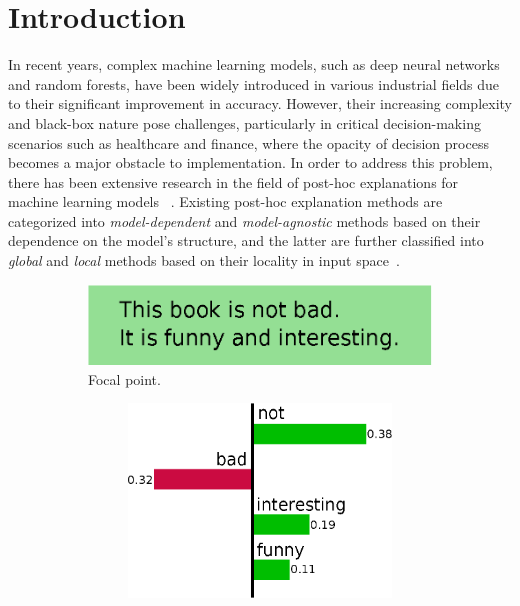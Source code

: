 \documentclass[runningheads]{llncs}
\begin{document}
{\section{Introduction}\label{sec:introduction}
In recent years,
complex machine learning models, such as deep neural networks and random forests,
have been widely introduced in various industrial fields
due to their significant improvement in accuracy.
However,
their increasing complexity and black-box nature pose challenges,
particularly in critical decision-making scenarios such as healthcare and finance,
where the opacity of decision process becomes a major obstacle to implementation.
In order to address this problem,
there has been extensive research in the field of post-hoc explanations
for machine learning models
~\cite{guidotti2018local,ribeiro2016why,ribeiro2018anchors}.
Existing post-hoc explanation methods are categorized
into \emph{model-dependent} and \emph{model-agnostic} methods
based on their dependence on the model's structure,
and the latter are further classified into \emph{global} and \emph{local} methods
based on their locality in input space~\cite{samek2021explaining}.
\begin{figure}[tbp]
  \def\scale{0.38}
  \centering
  \begin{subfigure}[t]{0.55\textwidth}
    \centering
    \includegraphics[scale=\scale]{example-instance}
    \caption{Focal point.}\label{fig:example-instance}
    \vspace{0.5cm}
  \end{subfigure}
  \begin{subfigure}[t]{0.45\textwidth}
    \begin{subfigure}[t]{\textwidth}
      \centering
      \includegraphics[scale=\scale]{example-lime}

\end{subfigure}
\end{subfigure}
\end{figure}}
\end{document}
